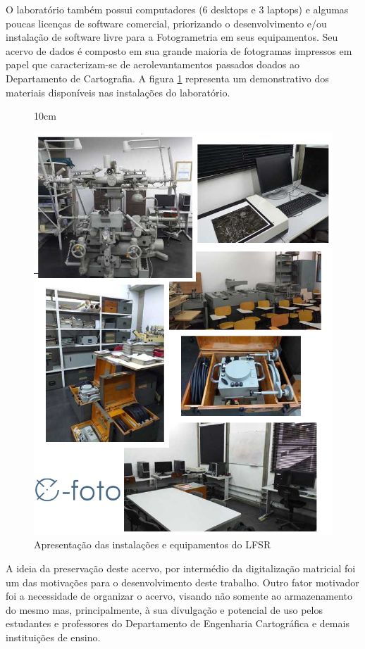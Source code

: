 O laboratório também possui computadores (6 desktops e 3 laptops) e algumas poucas licenças de software comercial, priorizando o desenvolvimento e/ou instalação de software livre para a Fotogrametria em seus equipamentos. Seu acervo de dados é composto em sua grande maioria de fotogramas impressos em papel que caracterizam-se de aerolevantamentos passados doados ao Departamento de Cartografia. A figura \ref{lab} representa um demonstrativo dos materiais disponíveis nas instalações do laboratório.

\begin{figure}[!ht]{10cm}
  \caption{Apresentação das instalações e equipamentos do LFSR} \label{lab}
  \centering
  \includegraphics[width=1\textwidth]{figuras/lab.png}
\end{figure}

A ideia da preservação deste acervo, por intermédio da digitalização matricial foi um das motivações para o desenvolvimento deste trabalho. Outro fator motivador foi a necessidade de organizar o acervo, visando não somente ao armazenamento do mesmo mas, principalmente, à sua divulgação e potencial de uso pelos estudantes e professores do Departamento de Engenharia Cartográfica e demais instituições de ensino.

